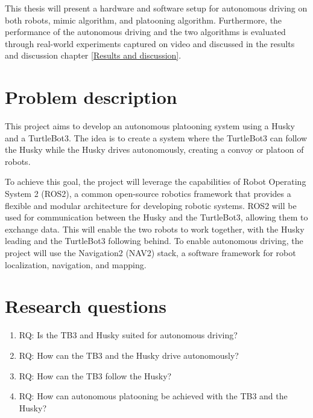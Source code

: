 This thesis will present a hardware and software setup for autonomous driving on both robots, mimic algorithm, and platooning algorithm. Furthermore, the performance of the autonomous driving and the two algorithms is evaluated through real-world experiments captured on video and discussed in the results and discussion chapter \ref{Results and discussion}.



\newpage
\section{Problem description}
This project aims to develop an autonomous platooning system using a Husky and a TurtleBot3. The idea is to create a system where the TurtleBot3 can follow the Husky while the Husky drives autonomously, creating a convoy or platoon of robots. 

To achieve this goal, the project will leverage the capabilities of Robot Operating System 2 (ROS2), a common open-source robotics framework that provides a flexible and modular architecture for developing robotic systems. ROS2 will be used for communication between the Husky and the TurtleBot3, allowing them to exchange data. This will enable the two robots to work together, with the Husky leading and the TurtleBot3 following behind.
To enable autonomous driving, the project will use the Navigation2 (NAV2) stack, a software framework for robot localization, navigation, and mapping. 


\section{Research questions}

\begin{enumerate}
    \item RQ: Is the TB3 and Husky suited for autonomous driving? 

    \item RQ: How can the TB3 and the Husky drive autonomously?
 
    \item RQ: How can the TB3 follow the Husky? 

    \item RQ: How can autonomous platooning be achieved with the TB3 and the Husky? 
\end{enumerate}


